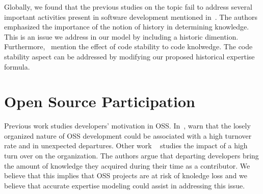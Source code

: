 Globally, we found that the previous studies on the topic fail to address several important activities present in software development mentioned in~\citep{Fritz-2007}. The authors emphasized the importance of the notion of history in determining knowledge. This is an issue we address in our model by including a historic dimention. Furthermore,~\citep{Fritz-2007} mention the effect of code stability to code knolwedge. The code stability aspect can be addressed by modifying our proposed historical expertise formula. 


\section{Open Source Participation}

Previous work studies developers' motivation in \ac{OSS}. In~\citep{Wu-oss}, warn that the losely organized nature of OSS development could be associated with a high turnover rate and in unexpected departures. Other work ~\citep{Rigby} studies the impact of a high turn over on the organization. The authors argue that departing developers bring the amount of knowledge they acquired during their time as a contributor. We believe that this implies that OSS projects are at risk of knoledge loss and we believe that accurate expertise modeling could assist in addressing this issue.





